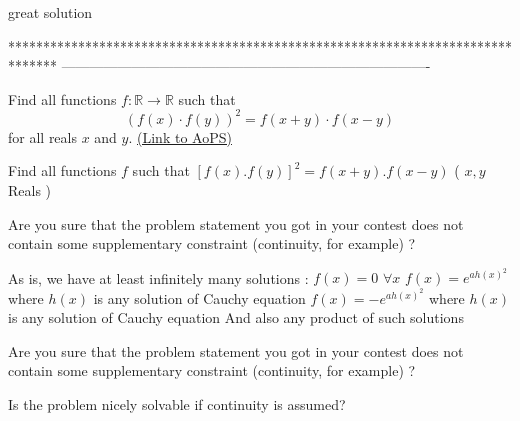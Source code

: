 \begin{solution}
	great solution
\end{solution}
*******************************************************************************
-------------------------------------------------------------------------------

\begin{problem}
	Find all functions $f: \mathbb R \to \mathbb R$ such that \[(f(x) \cdot f(y))^2=f(x+y)\cdot f(x-y)\] for all reals $x$ and $y$.
	\flushright \href{https://artofproblemsolving.com/community/c6h412704}{(Link to AoPS)}
\end{problem}



\begin{solution}
	\begin{tcolorbox}Find all functions $f$ such that $[f(x).f(y)]^2=f(x+y).f(x-y)$ ( $x ,y$ Reals )\end{tcolorbox}
Are you sure that the problem statement you got in your contest does not contain some supplementary constraint (continuity, for example) ?

As is, we have at least infinitely many solutions :
$f(x)=0$ $\forall x$
$f(x)=e^{ah(x)^2}$ where $h(x)$ is any solution of Cauchy equation
$f(x)=-e^{ah(x)^2}$ where $h(x)$ is any solution of Cauchy equation
And also any product of such solutions
\end{solution}



\begin{solution}
	\begin{tcolorbox}
Are you sure that the problem statement you got in your contest does not contain some supplementary constraint (continuity, for example) ?
\end{tcolorbox}

Is the problem nicely solvable if continuity is assumed?
\end{solution}



